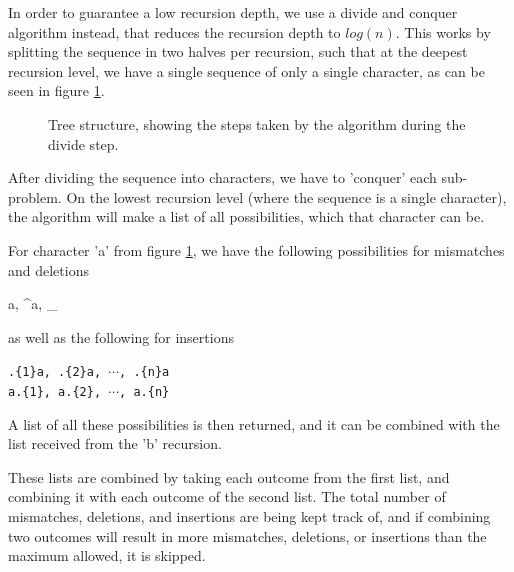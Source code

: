 \documentclass[12pt]{article}
\theoremstyle{definition}
\begin{document}
In order to guarantee a low recursion depth, we use a divide and conquer algorithm\cite{Algorithms} instead, that reduces the recursion depth to $log(n)$. This works by splitting the sequence in two halves per recursion, such that at the deepest recursion level, we have a single sequence of only a single character, as can be seen in figure \ref{fig:tree_example}. 

\begin{figure}[H]
	\centering
	\caption{Tree structure, showing the steps taken by the algorithm during the divide step.}
	\label{fig:tree_example}
\end{figure}

After dividing the sequence into characters, we have to 'conquer' each sub-problem. On the lowest recursion level (where the sequence is a single character), the algorithm will make a list of all possibilities, which that character can be.

\begin{example}[label=example:possibilities]
For character 'a' from figure \ref{fig:tree_example}, we have the following possibilities for mismatches and deletions

\begin{center}
	{a, \^{}a, \_}
\end{center}

as well as the following for insertions

\begin{center}
	\texttt{.\{1\}a, .\{2\}a, $\cdots$, .\{n\}a} \\
	\texttt{a.\{1\}, a.\{2\}, $\cdots$, a.\{n\}}
\end{center}

A list of all these possibilities is then returned, and it can be combined with the list received from the 'b' recursion.
\end{example}

These lists are combined by taking each outcome from the first list, and combining it with each outcome of the second list. The total number of mismatches, deletions, and insertions are being kept track of, and if combining two outcomes will result in more mismatches, deletions, or insertions than the maximum allowed, it is skipped.
\end{document}

